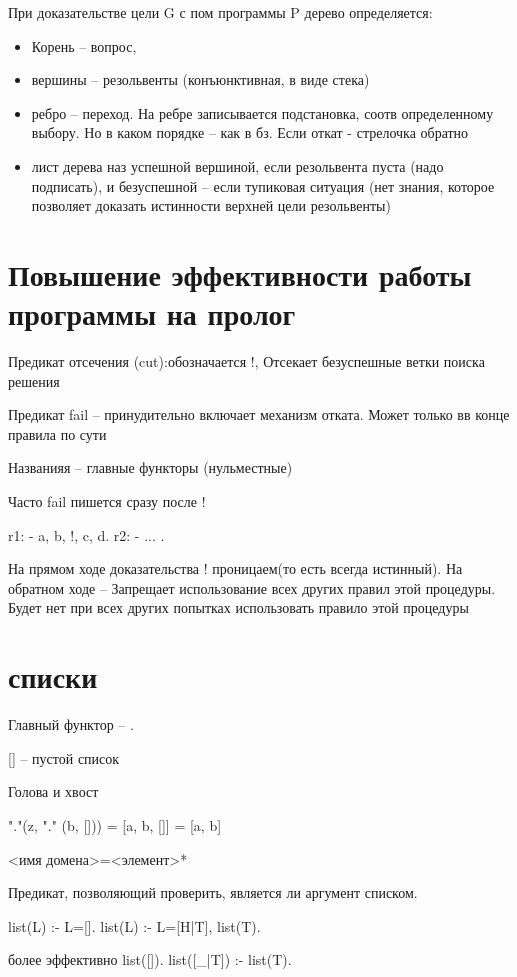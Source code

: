 \documentclass[12pt]{report}
\begin{document}
При доказательстве цели G с пом программы P дерево определяется: 

\begin{itemize}
\item  Корень -- вопрос, 
\item  вершины -- резольвенты (конъюнктивная, в виде стека)
\item  ребро -- переход. На ребре записывается подстановка, соотв определенному выбору. Но в каком порядке -- как в бз. Если откат - стрелочка обратно
\item  лист дерева наз успешной вершиной, если резольвента пуста (надо подписать), и безуспешной -- если тупиковая ситуация (нет знания, которое позволяет доказать истинности верхней цели резольвенты)
\end{itemize}

\section{Повышение эффективности работы программы на пролог}

Предикат отсечения (cut):обозначается !,  Отсекает безуспешные ветки поиска решения

Предикат fail  --  принудительно включает механизм отката. Может только вв конце правила по сути


Названияя -- главные функторы (нульместные)

Часто fail пишется сразу после !

r1: - a, b, !, c, d.
r2: - ... .

На прямом ходе доказательства ! проницаем(то есть всегда истинный). На обратном ходе -- Запрещает использование всех других правил этой процедуры. Будет нет при всех других попытках использовать правило этой процедуры


\section{списки}

Главный функтор -- . 

[] -- пустой список

Голова и хвост

"."(z, "." (b, []))  =  [a, b, []] = [a, b]

<имя домена>=<элемент>*

Предикат, позволяющий проверить, является ли аргумент списком. 

list(L) :- L=[].
list(L) :- L=[H|T], list(T).

более эффективно
list([]).
list([\_|T]) :- list(T).
\end{document}
